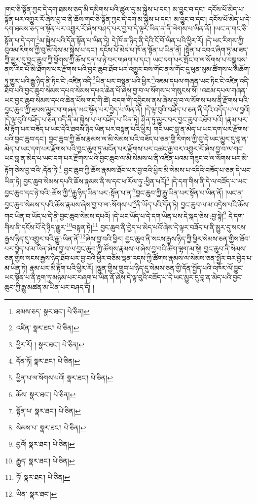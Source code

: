 །གང་ཅི་སྟོན་ཀྱང་དེ་དག་ཐམས་ཅད་མི་དམིགས་པའི་ཚུལ་དུ་མ་སྐྱེས་པ་དང་། མ་བྱུང་བ་དང་། དངོས་པོ་མེད་པ་སྟོན་པར་འགྱུར་རོ་ཞེས་བྱ་བ་ནི་ཆོས་གང་ཅི་སྟོན་ཀྱང་དེ་དག་མ་སྐྱེས་པ་དང་། མ་བྱུང་བ་དང་། དངོས་པོ་མེད་པ་དེ་དག་ཐམས་ཅད་ལ་སྟོན་པར་འགྱུར་རོ་ཞེས་བཤད་པར་བྱ་བ་དེ་ལྟར་ཡིན་ན་ནི་ལེགས་པ་ཡིན་ནོ། །ཡང་ན་གང་ཅི་སྟོན་པ་དེ་དག་\footnote{ཐམས་ཅད་  སྣར་ཐང་།  པེ་ཅིན། }མ་སྐྱེས་པའི་དོན་སྟོན་པ་ཡིན་ཏེ། དེ་ཁོ་ན་ཉིད་ནི་དེའི་ངོ་བོ་ཡིན་པའི་ཕྱིར་རོ། །དེ་ཡང་རིགས་ཀྱི་བུའམ་རིགས་ཀྱི་བུ་མོ་དེས་མ་སྐྱེས་པ་དང་། དངོས་པོ་མེད་པ་ཁོ་ན་སྟོན་པ་ཡིན་ནོ། །སྟོན་པ་འབའ་ཞིག་ཏུ་མ་ཟད་ཀྱི་མྱུར་དུ་བྱང་ཆུབ་ཀྱི་ཕྱོགས་ཀྱི་ཆོས་དྲན་པ་ཉེ་བར་གཞག་པ་དང་། ཡང་དག་པར་སྤོང་བ་ལ་སོགས་པ་བསྒྲུབས་ནས་རིང་པོ་མི་ཐོགས་པར་རྫོགས་པའི་བྱང་ཆུབ་ཐོབ་པར་འགྱུར་བས་གོང་ནས་གོང་དུ་ཕུན་སུམ་ཚོགས་པ་མཆོག་ཏུ་གྱུར་པའི་རྒྱུ་ཉིད་ནི་ཏིང་ངེ་:འཛིན་འདི་\footnote{འཛིན་  སྣར་ཐང་།  པེ་ཅིན། }ཡིན་པར་བསྟན་པའི་ཕྱིར་\footnote{ཕྱིར་རོ། །  སྣར་ཐང་།  པེ་ཅིན། }འཇམ་དཔལ་གཞན་ཡང་ཏིང་ངེ་འཛིན་འདི་ཐོབ་པའི་བྱང་ཆུབ་སེམས་དཔའ་སེམས་དཔའ་ཆེན་པོ་ཞེས་བྱ་བ་ལ་སོགས་པ་གསུངས་སོ། །འཇམ་དཔལ་གཞན་ཡང་བྱང་ཆུབ་སེམས་དཔའ་ཆེན་པོས་གང་གི་ཚེ། བདག་གི་དབྱིངས་ནས་ཞེས་བྱ་བ་ལ་སོགས་པས་ནི་རྫོགས་པའི་བྱང་ཆུབ་ཀྱི་ཐབས་མྱུར་བ་གཞན་ཡང་སྟོན་པར་བྱེད་པ་ཡིན་ནོ། །དེ་ལྟ་བུའི་བཟོད་པ་ཅན་ནི་དེའི་འདོད་པ་ལ་བྱའོ། །དེ་ལྟ་བུའི་བཟོད་པ་ཅན་འདི་ནི་མ་སྐྱེས་པ་ལ་བཟོད་པ་ཡིན་ཏེ། ཤིན་ཏུ་མྱུར་བར་བྱང་ཆུབ་འཐོབ་པའོ། །རྣམ་པར་མི་རྟོག་པར་བཟོད་པ་ཡང་དེའི་ཐབས་ཉིད་ཡིན་པར་བསྟན་པའི་ཕྱིར། གང་ཡང་བླ་ན་མེད་པ་ཡང་དག་པར་རྫོགས་པའི་བྱང་ཆུབ་དང་། བྱང་ཆུབ་ཀྱི་ཆོས་རྣམས་ལ་མི་སེམས་པའི་བཟོད་པ་ཅན་གྱི་རིགས་ཀྱི་བུ་དེ་ཡང་མྱུར་དུ་བླ་ན་མེད་པ་ཡང་དག་པར་རྫོགས་པའི་བྱང་ཆུབ་ཏུ་མངོན་པར་རྫོགས་པར་འཚང་རྒྱ་བར་འགྱུར་རོ་ཞེས་བྱ་བ་ལ་གང་ཡང་བླ་ན་མེད་པ་ཡང་དག་པར་རྫོགས་པའི་བྱང་ཆུབ་ལ་མི་སེམས་པ་ནི་འཛིན་པའམ་གཟུང་བ་ལ་སོགས་པར་མི་རྟོག་ཅེས་བྱ་བའི་:དོན་ཏེ།\footnote{དོན་ཏོ།  སྣར་ཐང་།  པེ་ཅིན། } བྱང་ཆུབ་ཀྱི་ཆོས་རྣམས་ཐོབ་པར་བྱ་བའི་ཕྱིར་མི་སེམས་པ་འདིའི་བཟོད་པ་ཅན་དེ་ཡང་ཡིན་ཏེ། བྱང་ཆུབ་སེམས་དཔའི་ཆོས་རྣམས་ནི་ས་དང་ཕ་རོལ་ཏུ་:ཕྱིན་པའོ།\footnote{ཕྱིན་པ་ལ་སོགས་པའོ།  སྣར་ཐང་།  པེ་ཅིན། } །དེ་དག་གིས་ནི་དེ་ལ་བཟོད་པ་ཡང་བྱང་ཆུབ་དང་ཉེ་བའི་:ཆོས་ཀྱི་\footnote{ཆོས་  སྣར་ཐང་།  པེ་ཅིན། }རྒྱུ་ཉིད་ཡིན་པར་:སྟོན་པ་ན་\footnote{སྟོན་པ་  སྣར་ཐང་།  པེ་ཅིན། }བྱང་ཆུབ་ཀྱི་རྒྱུ་ཡིན་པར་སྟོན་པ་ཡིན་ནོ། །ཡང་ན་བྱང་ཆུབ་སེམས་དཔའི་ཆོས་རྣམས་ཞེས་བྱ་བ་ལ་:སོགས་པ་\footnote{སེམས་པ་  སྣར་ཐང་།  པེ་ཅིན། }ནི་ཡོད་པའི་དོན་ཏེ། བྱང་ཆུབ་ལ་མ་འདྲེས་པའི་ཆོས་གང་ཡིན་བ་ཡོད་པ་དེ་ནི་བྱང་ཆུབ་སེམས་དཔའོ། །དེ་ཡང་ཡོད་པ་དེ་དག་ཡིན་པས་དེ་སྐད་ཅེས་:བྱ་སྟེ།\footnote{བྱའོ།  སྣར་ཐང་།  པེ་ཅིན། } དེ་དག་གིས་ནི་དངོས་པོ་དེ་ཉིད་རྒྱུར་\footnote{རྒྱུད་  སྣར་ཐང་།  པེ་ཅིན། }བསྟན་ཏེ།\footnote{ཏོ།  སྣར་ཐང་།  པེ་ཅིན། } བྱང་ཆུབ་ནི་བྱེད་པ་མེད་པའོ་ཞེས་དེ་ལྟར་བཟོད་པ་ནི་མྱུར་དུ་སངས་རྒྱས་ཉིད་དུ་འགྱུར་བའི་རྒྱུ་:ཡིན་ནོ་\footnote{ཡིན་  སྣར་ཐང་། }ཞེས་བྱ་བའི་ཕྱིར། བྱང་ཆུབ་ནི་སངས་རྒྱས་ཉིད་ཀྱི་ཕྱིར་སེམས་ཅན་གྱིས་ཐོབ་པར་བྱེད་པ་མ་ཡིན་ཞེས་བྱ་བ་ལ་བྱང་ཆུབ་ཀྱི་ཚོགས་རྣམས་ལ་ཞེས་བྱ་བའི་ཚིག་ལྷག་མ་སྟེ། བྱང་ཆུབ་ནི་སེམས་ཅན་གྱིས་སངས་རྒྱས་ཉིད་ཐོབ་པར་བྱ་བའི་ཕྱིར་བཅོམ་ལྡན་འདས་ཀྱི་ཚོགས་རྣམས་ལ་སེམས་ཅན་སྦྱོར་བར་བྱེད་པ་མ་ཡིན་ཏེ། རྣམ་པར་མི་རྟོག་པའི་ཕྱིར་རོ། །ལྷུན་གྱིས་གྲུབ་པ་ཉིད་དུ་སེམས་ཅན་གྱི་དོན་སྤྱོད་པའི་འཁོར་ལོ་བྱུང་ཡང་སྟོན་པ་ནི་རྟག་ཏུ་མཉམ་པར་བཞག་པ་ཡིན་ནོ་ཞེས་དེ་ལྟ་བུའི་བཟོད་པ་དེ་ཡང་མྱུར་དུ་བླ་ན་མེད་པའི་བྱང་ཆུབ་ཀྱི་རྒྱུ་མཚན་མ་ཡིན་པར་བཤད་དོ། །

